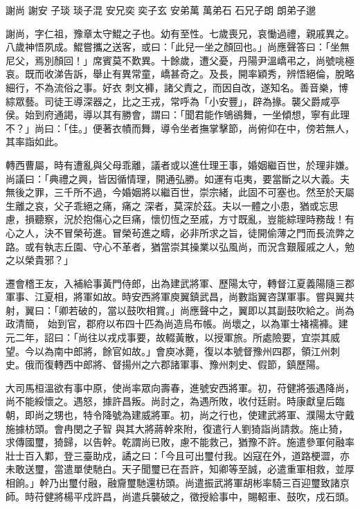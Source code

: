 
\begin{pinyinscope}

 謝尚 謝安 子琰 琰子混 安兄奕 奕子玄 安弟萬 萬弟石 石兄子朗 朗弟子邈



 謝尚，字仁祖，豫章太守鯤之子也。幼有至性。七歲喪兄，哀慟過禮，親戚異之。八歲神悟夙成。鯤嘗攜之送客，或曰：「此兒一坐之顏回也。」尚應聲答曰：「坐無尼父，焉別顏回！」席賓莫不歎異。十餘歲，遭父憂，丹陽尹溫嶠弔之，尚號咷極哀。既而收涕告訴，舉止有異常童，嶠甚奇之。及長，開率穎秀，辨悟絕倫，脫略細行，不為流俗之事。好衣
 刺文褲，諸父責之，而因自改，遂知名。善音樂，博綜眾藝。司徒王導深器之，比之王戎，常呼為「小安豐」，辟為掾。襲父爵咸亭侯。始到府通謁，導以其有勝會，謂曰：「聞君能作鴝鵒舞，一坐傾想，寧有此理不？」尚曰：「佳。」便著衣幘而舞，導令坐者撫掌擊節，尚俯仰在中，傍若無人，其率詣如此。



 轉西曹屬，時有遭亂與父母乖離，議者或以進仕理王事，婚姻繼百世，於理非嫌。尚議曰：「典禮之興，皆因循情理，開通弘勝。如運有屯夷，要當斷之以大義。夫無後之罪，三千所不過，今婚姻將以繼百世，崇宗緒，此固不可塞也。然至於天屬生離之哀，父子乖絕之痛，痛之
 深者，莫深於茲。夫以一體之小患，猶或忘思慮，損聽察，況於抱傷心之巨痛，懷忉恆之至戚，方寸既亂，豈能綜理時務哉！有心之人，決不冒榮茍進。冒榮茍進之疇，必非所求之旨，徒開偷薄之門而長流弊之路。或有執志丘園、守心不革者，猶當崇其操業以弘風尚，而況含艱履戚之人，勉之以榮貴邪？」



 遷會稽王友，入補給事黃門侍郎，出為建武將軍、歷陽太守，轉督江夏義陽隨三郡軍事、江夏相，將軍如故。時安西將軍庾翼鎮武昌，尚數詣翼咨謀軍事。嘗與翼共射，翼曰：「卿若破的，當以鼓吹相賞。」尚應聲中之，翼即以其副鼓吹給之。尚為政清簡，
 始到官，郡府以布四十匹為尚造烏布帳。尚壞之，以為軍士褚襦褲。建元二年，詔曰：「尚往以戎戍事要，故輟黃散，以授軍旅。所處險要，宜崇其威望。今以為南中郎將，餘官如故。」會庾冰薨，復以本號督豫州四郡，領江州刺史。俄而復轉西中郎將、督揚州之六郡諸軍事、豫州刺史、假節，鎮歷陽。



 大司馬桓溫欲有事中原，使尚率眾向壽春，進號安西將軍。初，苻健將張遇降尚，尚不能綏懷之。遇怒，據許昌叛。尚討之，為遇所敗，收付廷尉。時康獻皇后臨朝，即尚之甥也，特令降號為建威將軍。初，尚之行也，使建武將軍、濮陽太守戴施據枋頭。會冉閔之子智
 與其大將蔣幹來附，復遣行人劉猗詣尚請救。施止猗，求傳國璽，猗歸，以告幹。乾謂尚已敗，慮不能救己，猶豫不許。施遣參軍何融率壯士百入鄴，登三臺助戍，譎之曰：「今且可出璽付我。凶寇在外，道路梗澀，亦未敢送璽，當遣單使馳白。天子聞璽已在吾許，知卿等至誠，必遣重軍相救，並厚相餉。」幹乃出璽付融，融齎璽馳還枋頭。尚遣振武將軍胡彬率騎三百迎璽致諸京師。時苻健將楊平戍許昌，尚遣兵襲破之，徵授給事中，賜軺車、鼓吹，戍石頭。




\end{pinyinscope}
